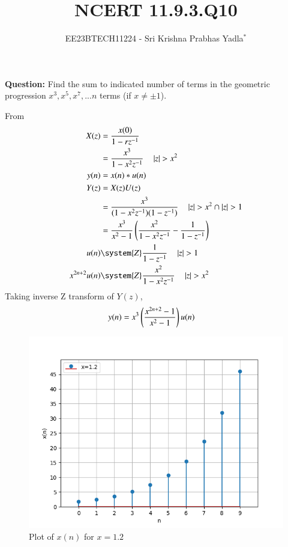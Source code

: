 \documentclass[journal,12pt,twocolumn]{IEEEtran}
\theoremstyle{remark}
\begin{document}

\vspace{3cm}

\title{NCERT 11.9.3.Q10}
\author{EE23BTECH11224 - Sri Krishna Prabhas Yadla$^{*}$%
}
\maketitle
\newpage
\bigskip

\renewcommand{\thefigure}{\arabic{figure}}
\renewcommand{\thetable}{\arabic{table}}


\vspace{3cm}
\textbf{Question:} Find the sum to indicated number of terms in the geometric progression $x^3,x^5,x^7,...n$ terms (if $x\neq\pm1$).
\\
\solution

\newline
From 
\begin{align}
	X(z) &= \frac{x(0)}{1-rz^{-1}} \\
	&= \frac{x^3}{1-x^2z^{-1}} \quad \abs{z}>x^2 \\
	y(n) &= x(n) * u(n) \\
	Y(z) &= X(z)U(z) \\
	&= \frac{x^3}{(1-x^2z^{-1})(1-z^{-1})} \quad  \abs{z} > x^2 \cap \abs{z}>1\\
	&= \frac{x^3}{x^2-1}\brak{\frac{x^2}{1-x^2z^{-1}}-\frac{1}{1-z^{-1}}} \\
	u(n) &\system{Z} \frac{1}{1-z^{-1}} \quad \abs{z}>1\\
	x^{2n+2} u(n) &\system{Z} \frac{x^2}{1-x^2z^{-1}} \quad \abs{z}>x^2
\end{align}
Taking inverse Z transform of $Y(z)$,
\begin{align}
	y(n) &= x^3\left(\frac{x^{2n+2}-1}{x^2-1}\right)u(n)
\end{align}
\begin{figure}[ht!]
	\includegraphics[width=\columnwidth]{figs/plot_2.png}
	\caption{Plot of $x(n)$ for $x=1.2$}
	\label{fig:1.2}
\end{figure}
\end{document}
